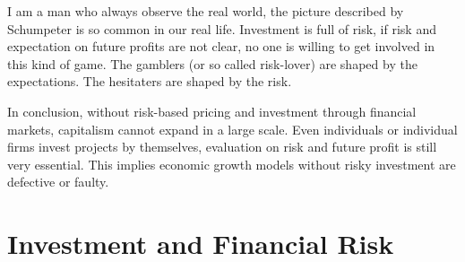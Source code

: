\documentclass[12pt]{article}
\theoremstyle{definition}
\numberwithin{equation}{section}
\numberwithin{figure}{section}
\numberwithin{table}{section}
\begin{document}
I am a man who always observe the real world, the picture described by Schumpeter is so common in our real life. Investment is full of risk, if risk and expectation on future profits are not clear, no one is willing to get involved in this kind of game. The gamblers (or so called risk-lover) are shaped by the expectations. The hesitaters are shaped by the risk.

In conclusion, without risk-based pricing and investment through financial markets, capitalism cannot expand in a large scale. Even individuals or individual firms invest projects by themselves, evaluation on risk and future profit is still very essential. This implies economic growth models without risky investment are defective or faulty.

\section{Investment and Financial Risk}
\end{document}
